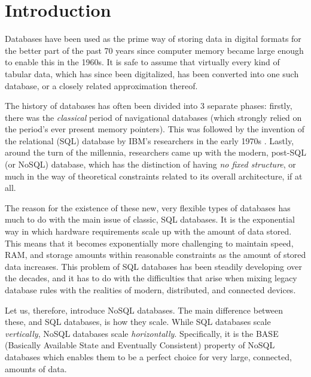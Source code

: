 \documentclass[10pt,        %
               a4paper,     %
               journal,     %
               ]{IEEEtran}
\begin{document}


\section{Introduction}
Databases have been used as the prime way of storing data in digital formats for the better part of the past 70 years since computer memory became large enough to enable this in the 1960s. It is safe to assume that virtually every kind of tabular data, which has since been digitalized, has been converted into one such database, or a closely related approximation thereof. \cite{bachman_1973} \par
The history of databases has often been divided into 3 separate phases: firstly, there was the \textit{classical} period of navigational databases (which strongly relied on the period's ever present memory pointers). This was followed by the invention of the relational (SQL) database by IBM's researchers in the early 1970s \cite{codd_1970}. Lastly, around the turn of the millennia, researchers came up with the modern, post-SQL (or NoSQL) database, which has the distinction of having \textit{no fixed structure}, or much in the way of theoretical constraints related to its overall architecture, if at all. \par
The reason for the existence of these new, very flexible types of databases has much to do with the main issue of classic, SQL databases. It is the exponential way in which hardware requirements scale up with the amount of data stored. This means that it becomes exponentially more challenging to maintain speed, RAM, and storage amounts within reasonable constraints as the amount of stored data increases. This problem of SQL databases has been steadily developing over the decades, and it has to do with the difficulties that arise when mixing legacy database rules with the realities of modern, distributed, and connected devices. \cite{IEEEpaper1:comparison} \par
Let us, therefore, introduce NoSQL databases. The main difference between these, and SQL databases, is how they scale. While SQL databases scale \textit{vertically}, NoSQL databases scale \textit{horizontally}. Specifically, it is the BASE (Basically Available State and Eventually Consistent) property of NoSQL databases which enables them to be a perfect choice for very large, connected, amounts of data. \par
\end{document}
